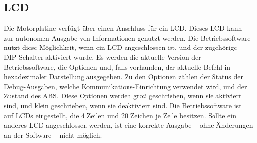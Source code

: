 \subsection{LCD}
Die Motorplatine verfügt über einen Anschluss für ein LCD. Dieses LCD kann zur autonomen Ausgabe
von Informationen genutzt werden. Die Betriebssoftware nutzt diese Möglichkeit,
wenn ein LCD angeschlossen ist, und der zugehörige DIP-Schalter aktiviert wurde.
Es werden die aktuelle Version der Betriebssoftware, die Optionen und, falls vorhanden,
der aktuelle Befehl in hexadezimaler Darstellung ausgegeben. Zu den Optionen zählen der Status der Debug-Ausgaben,
welche Kommunikations-Einrichtung verwendet wird, und der Zustand des ABS. Diese Optionen
werden groß geschrieben, wenn sie aktiviert sind, und klein geschrieben, wenn sie
deaktiviert sind. Die Betriebssoftware ist auf LCDs eingestellt, die 4 Zeilen und 20 Zeichen je Zeile besitzen.
Sollte ein anderes LCD angeschlossen werden, ist eine korrekte Ausgabe -- ohne
Änderungen an der Software -- nicht möglich.
